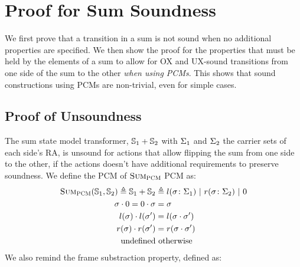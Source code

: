 \chapter{Proof for Sum Soundness} \label{ap:sum-soundness}

We first prove that a transition in a sum is not sound when no additional properties are specified. We then show the proof for the properties that must be held by the elements of a sum to allow for OX and UX-sound transitions from one side of the sum to the other \emph{when using PCMs}. This shows that sound constructions using PCMs are non-trivial, even for simple cases.

\section{Proof of Unsoundness}

The sum state model transformer, $\mathbb S_1 + \mathbb S_2$ with $\Sigma_1$ and $\Sigma_2$ the carrier sets of each side's RA, is unsound for actions that allow flipping the sum from one side to the other, if the actions doesn't have additional requirements to preserve soundness. We define the PCM of $\textsc{Sum}_{\textsc{PCM}}$ PCM as: \begin{align*}
	\textsc{Sum}_{\textsc{PCM}}(\mathbb S_1, \mathbb S_2) \triangleq \mathbb S_1 + \mathbb S_2 &\triangleq l(\sigma\colon \Sigma_1) ~|~ r(\sigma\colon \Sigma_2) ~|~ 0 \\
	\sigma \cdot 0 = 0 \cdot \sigma &= \sigma\\
	l(\sigma) \cdot l(\sigma') &= l(\sigma\cdot\sigma')\\
	r(\sigma) \cdot r(\sigma') &= r(\sigma\cdot\sigma')\\
	\text{undefined}&\text{ otherwise}
\end{align*} We also remind the frame substraction property, defined as:

\newcommand{\swap}[0]{\code{swap}}
\newcommand{\execswap}[2]{\ppexecc{\swap}{#1}{#2}}

